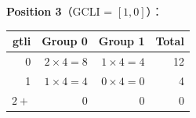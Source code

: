 \begin{examplebox}[title={RC Worked Example 1：从 Precinct 数据推导预算表}]
\textbf{Position 3}（GCLI = $[1, 0]$）：

\begin{tabular}{@{}rrrr@{}}
\toprule
gtli & Group 0 & Group 1 & Total \\
\midrule
0 & $2 \times 4 = 8$  & $1 \times 4 = 4$ & 12 \\
1 & $1 \times 4 = 4$  & $0 \times 4 = 0$ & 4  \\
$2+$ & 0 & 0 & 0 \\
\bottomrule
\end{tabular}

\end{examplebox}
